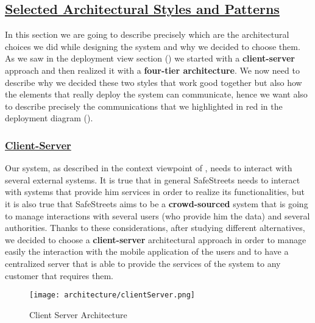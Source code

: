 	
		\FloatBarrier
		
	\subsection[Selected Architectural Styles and Patterns]{\hyperlink{toc}{Selected Architectural Styles and Patterns}}
		\label{sec:selectedArchitecturalStylesAndPatterns}
		
		In this section we are going to describe precisely which are the architectural choices we did while designing the system and why we decided to choose them. As we saw in the deployment view section () we started with a \textbf{client-server} approach and then realized it with a \textbf{four-tier architecture}. We now need to describe why we decided these two styles that work good together but also how the elements that really deploy the system can communicate, hence we want also to describe precisely the communications that we highlighted in red in the deployment diagram ().
		
		\subsubsection[Client-Server]{\hyperlink{toc}{Client-Server}}
			\label{sec:clientServerDecision}
			
			Our system, as described in the context viewpoint of , needs to interact with several external systems. It is true that in general SafeStreets needs to interact with systems that provide him services in order to realize its functionalities, but it is also true that SafeStreets aims to be a \textbf{crowd-sourced} system that is going to manage interactions with several users (who provide him the data) and several authorities. Thanks to these considerations, after studying different alternatives, we decided to choose a \textbf{client-server} architectural approach in order to manage easily the interaction with the mobile application of the users and to have a centralized server that is able to provide the services of the system to any customer that requires them.
			
			\vspace{0.3cm}
			
			\begin{figure}[h!]
				\centering
				\texttt{[image: architecture/clientServer.png]}
				\caption{\label{fig:clientServerArchitecture} Client Server Architecture}
			\end{figure}

